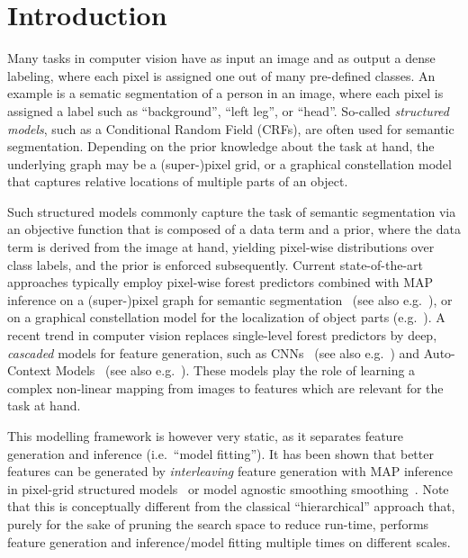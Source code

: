 \documentclass[10pt,twocolumn,letterpaper]{article}
\begin{document}
\section{Introduction}
Many tasks in computer vision have as input an image and as output a dense labeling, where each pixel is assigned one out of many pre-defined classes. An example is a sematic segmentation of a person in an image, where each pixel is assigned a label such as “background”, “left leg”, or “head”. 
%
So-called \emph{structured models}, such as a Conditional Random Field (CRFs), are often used for semantic segmentation. 
Depending on the prior knowledge about the task at hand, the underlying graph may be a (super-)pixel grid, or a graphical constellation model that captures relative locations of multiple parts of an object. 
%

Such structured models commonly capture the task of semantic segmentation via an objective function that is composed of a data term and a prior, 
%
where the data term is derived from the image at hand, yielding pixel-wise distributions over class labels, and the prior is enforced subsequently. 
%
%
Current state-of-the-art approaches typically employ pixel-wise forest predictors combined with MAP inference on a (super-)pixel graph for semantic segmentation~\cite{TextonBoost,Schroff08objectclass} (see also e.g.\ \cite{funke2014candidate}), or on a graphical constellation model for the localization of object parts (e.g.\ \cite{Glocker2012,Glocker2013,TeethMICCAI2012,SeifertAnatomicalSPIE2009}). 
%
A recent trend in computer vision replaces single-level forest predictors by deep, \emph{cascaded} models for feature generation, such as CNNs~\cite{NIPS2012_4824} (see also e.g.\ \cite{funke2014candidate}) and Auto-Context Models~\cite{AutoContext2008} (see also e.g.\ \cite{PoseMachinesECCV2014}). 
%
These models play the role of learning a complex non-linear mapping from images to features which are relevant for the task at hand. 

This modelling framework is however very static, as it separates feature generation and inference (i.e.\ "`model fitting"'). 
%
It has been shown that better features can be generated by \emph{interleaving} feature generation with MAP inference in pixel-grid structured models~\cite{DTF,RTF,UweCVPR2013} 
%
or model agnostic smoothing smoothing~\cite{GeoForests2013}. Note that this is conceptually different from the classical ``hierarchical'' approach that, purely for the sake of pruning the search space to reduce run-time, performs feature generation and inference/model fitting multiple times on different scales.
\end{document}
